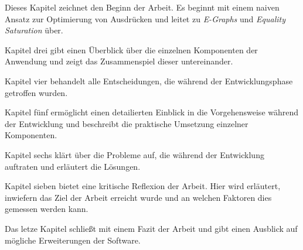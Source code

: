 \vspace{-2mm}

Dieses Kapitel zeichnet den Beginn der Arbeit. Es beginnt mit einem naiven Ansatz zur Optimierung von Ausdrücken und leitet zu \textit{E-Graphs} und \textit{Equality Saturation} über.

\vspace{6mm}

\vspace{-2mm}

Kapitel drei gibt einen Überblick über die einzelnen Komponenten der Anwendung und zeigt das Zusammenspiel dieser untereinander.
\vspace{6mm}

\vspace{-2mm}

Kapitel vier behandelt alle Entscheidungen, die während der Entwicklungsphase getroffen wurden.
\vspace{6mm}

\vspace{-2mm}

Kapitel fünf ermöglicht einen detailierten Einblick in die Vorgehensweise während der Entwicklung und beschreibt die praktische Umsetzung einzelner Komponenten.

\vspace{6mm}

\vspace{-2mm}

Kapitel sechs klärt über die Probleme auf, die während der Entwicklung auftraten und erläutert die Lösungen.
\vspace{6mm}

\vspace{-2mm}

Kapitel sieben bietet eine kritische Reflexion der Arbeit. Hier wird erläutert, inwiefern das Ziel der Arbeit erreicht wurde und an welchen Faktoren dies gemessen werden kann.

\vspace{6mm}

\vspace{-2mm}

Das letze Kapitel schließt mit einem Fazit der Arbeit und gibt einen Ausblick auf mögliche Erweiterungen der Software.